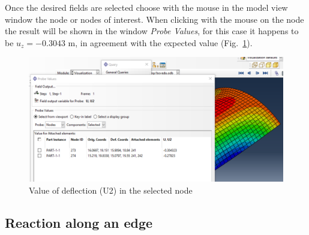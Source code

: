 \documentclass[english,a4paper,12pt]{article}
\begin{document}
Once the desired fields are selected choose with the mouse in the model view window the node or nodes of interest.
When clicking with the mouse on the node the result will be shown in the window \emph{Probe Values}, for this case it happens to be $u_{z}=-0.3043$ m, in agreement with the expected value 
(Fig.~\ref{fig8}). 
\begin{figure}[h!tp]
\centering
	\includegraphics[scale=0.45]{capturas2019/a_fig34.png}
  \caption{Value of deflection (U2) in the selected node}
  \label{fig8}
\end{figure}

\clearpage

\subsection{Reaction along an edge}
\end{document}
